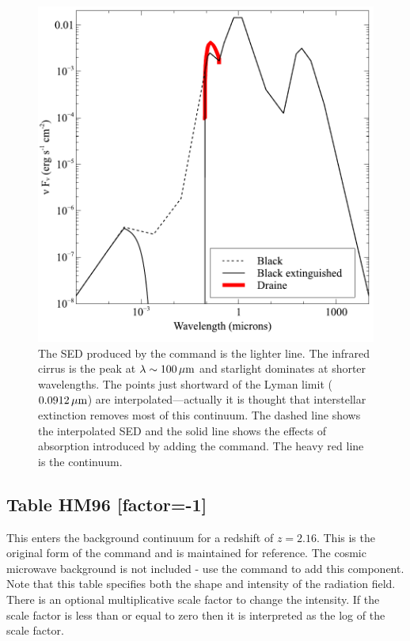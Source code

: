 \begin{figure}
\centering
\includegraphics{ism_background}
\caption[ISM radiation field]
{\label{fig:ISM_background}The SED produced by the  command is the lighter
line.
The infrared cirrus is the peak at $\lambda \sim  100\,\hbox{$\mu$m}$ and starlight
dominates at shorter wavelengths.
The points just shortward of the Lyman
limit ($0.0912\,\hbox{$\mu$m}$) are interpolated---actually it is thought that interstellar
extinction removes most of this continuum.
The dashed line shows the
interpolated SED and the solid line shows the effects of absorption
introduced by adding the  command.
The heavy red line is the  continuum. }
\end{figure}

\subsection{Table HM96 [factor=-1]}

This enters the \citet{Haardt1996} background continuum for a redshift
of $z = 2.16$.  This is the original form of the command and is maintained
for reference.  The cosmic microwave background is not included - use the
 command to add this component.  Note that
this table specifies both the shape and intensity of the radiation field.
There
is an optional multiplicative scale factor to change the intensity.  If
the scale factor is less than or equal to zero then it is interpreted as
the log of the scale factor.


